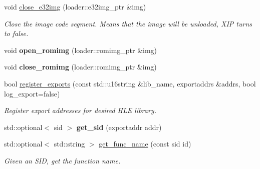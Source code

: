 \begin{DoxyCompactItemize}
\mbox{\label{classeka2l1_1_1hle_1_1lib__manager_ac5fe1d63f0854b9169f9f008b4ca9cab}} 
void \mbox{\hyperlink{classeka2l1_1_1hle_1_1lib__manager_ac5fe1d63f0854b9169f9f008b4ca9cab}{close\+\_\+e32img}} (loader\+::e32img\+\_\+ptr \&img)
\begin{DoxyCompactList}\small\item\em Close the image code segment. Means that the image will be unloaded, X\+IP turns to false. \end{DoxyCompactList}\item 
\mbox{\label{classeka2l1_1_1hle_1_1lib__manager_a282d25052cb2732967de591c4dc80850}} 
void {\bfseries open\+\_\+romimg} (loader\+::romimg\+\_\+ptr \&img)
\item 
\mbox{\label{classeka2l1_1_1hle_1_1lib__manager_afee2d8bf4ea626a8ed164605c55e31dd}} 
void {\bfseries close\+\_\+romimg} (loader\+::romimg\+\_\+ptr \&img)
\item 
bool \mbox{\hyperlink{classeka2l1_1_1hle_1_1lib__manager_a79eea8bce230c84310e191a03c3534a9}{register\+\_\+exports}} (const std\+::u16string \&lib\+\_\+name, exportaddrs \&addrs, bool log\+\_\+export=false)
\begin{DoxyCompactList}\small\item\em Register export addresses for desired H\+LE library. \end{DoxyCompactList}\item 
\mbox{\label{classeka2l1_1_1hle_1_1lib__manager_af6860ae6fd7aecd6d8513697072e00db}} 
std\+::optional$<$ sid $>$ {\bfseries get\+\_\+sid} (exportaddr addr)
\item 
\mbox{\label{classeka2l1_1_1hle_1_1lib__manager_a1faf5b10532e27f121a3bf4ccf78d2af}} 
std\+::optional$<$ std\+::string $>$ \mbox{\hyperlink{classeka2l1_1_1hle_1_1lib__manager_a1faf5b10532e27f121a3bf4ccf78d2af}{get\+\_\+func\+\_\+name}} (const sid id)
\begin{DoxyCompactList}\small\item\em Given an S\+ID, get the function name. \end{DoxyCompactList}\item 
\mbox{\label{classeka2l1_1_1hle_1_1lib__manager_ae93df9f2a1974fd080a3154853727625}} 

\end{DoxyCompactItemize}
